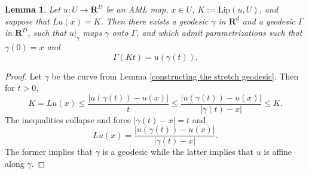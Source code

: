 \documentclass[reqno,11pt]{amsart}
\newcommand{\RR}{\mathbf{R}}
\newcommand{\Lip}{\mathrm{Lip}}
\newtheorem{lemma}[theorem]{Lemma}
\theoremstyle{definition}
\numberwithin{equation}{section}
\begin{document}
\begin{lemma}\label{geodesics still incomplete}
Let $u: U \to \RR^D$ be an AML map, $x \in U$, $K := \Lip(u, U)$, and suppose that $Lu(x) = K$.
Then there exists a geodesic $\gamma$ in $\RR^d$ and a geodesic $\Gamma$ in $\RR^D$, such that $u|_\gamma$ maps $\gamma$ onto $\Gamma$, and which admit parametrizations such that $\gamma(0) = x$ and
$$\Gamma(Kt) = u(\gamma(t)).$$
\end{lemma}
\begin{proof}
Let $\gamma$ be the curve from Lemma \ref{constructing the stretch geodesic}.
Then for $t > 0$,
$$K = Lu(x) \leq \frac{|u(\gamma(t)) - u(x)|}{t} \leq \frac{|u(\gamma(t)) - u(x)|}{|\gamma(t) - x|} \leq K.$$
The inequalities collapse and force $|\gamma(t) - x| = t$ and 
$$Lu(x) = \frac{|u(\gamma(t)) - u(x)|}{|\gamma(t) - x|}.$$
The former implies that $\gamma$ is a geodesic while the latter implies that $u$ is affine along $\gamma$.
\end{proof}

\end{document}

